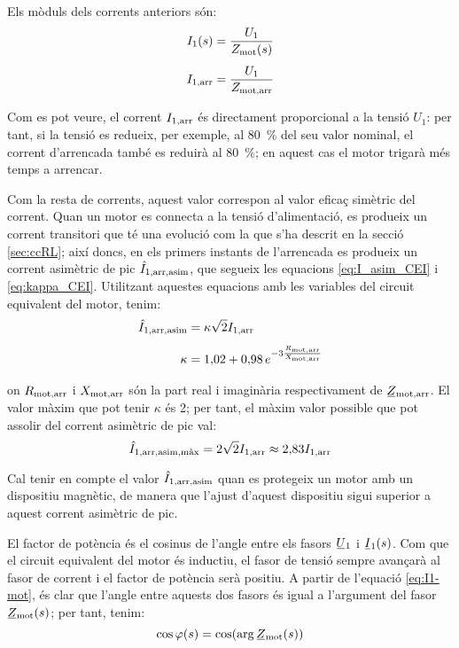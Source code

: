 Els mòduls dels corrents anteriors són:
\begin{subequations}
\begin{align}
    I_1(s) &= \frac{U_1}{Z_\mathrm{mot}(s)} \label{eq:mot-I1}\\[1ex]
    I_\mathrm{1,arr} &= \frac{U_1}{Z_\mathrm{mot,arr}}\label{eq:mot-Iarr}
\end{align}
\end{subequations}

Com es pot veure, el corrent $I_\mathrm{1,arr}$ és directament proporcional a la tensió $U_1$:  per tant, si la tensió es redueix, per exemple, al \qty{80}{\%} del seu valor nominal, el corrent d'arrencada també es reduirà al \qty{80}{\%}; en aquest cas el motor trigarà més temps a arrencar.

Com la resta de corrents, aquest valor correspon al valor eficaç simètric del corrent. Quan un motor es connecta a la tensió d'alimentació, es produeix un corrent transitori que té una evolució com la que s'ha descrit en la secció \vref{sec:ccRL}; així doncs, en els primers instants de l'arrencada es produeix un corrent asimètric de pic $\hat{I}_\mathrm{1,arr,asim}$, que segueix les equacions \eqref{eq:I_asim_CEI} i \eqref{eq:kappa_CEI}. Utilitzant aquestes equacions amb les variables del circuit equivalent del motor, tenim:
\begin{subequations}
\begin{align}
    \hat{I}_\mathrm{1,arr,asim} &= \kappa \sqrt{2} I_\mathrm{1,arr}  \\[1ex]
    \kappa &= 1{,}02 + 0{,}98 \,e^{-3\frac{R_\mathrm{mot,arr}}{X_\mathrm{mot,arr}}}
\end{align}
\end{subequations}

on $R_\mathrm{mot,arr}$ i $X_\mathrm{mot,arr}$ són la part real i imaginària respectivament de $\cmplx{Z}\ped{mot,arr}$. El valor màxim que pot tenir  $\kappa$ és 2;  per tant, el màxim valor possible que pot assolir del corrent asimètric de pic val:
\begin{equation}
	\hat{I}_\mathrm{1,arr,asim,\text{màx}} =  2\sqrt{2} I_\mathrm{1,arr} \approx 2{,}83 I_\mathrm{1,arr} 
\end{equation}

Cal tenir en compte el valor $\hat{I}_\mathrm{1,arr,asim}$ quan es protegeix un motor amb un dispositiu magnètic, de manera que l'ajust d'aquest dispositiu sigui superior a aquest corrent asimètric de  pic.

El factor de potència és el cosinus de l'angle entre els fasors $\cmplx{U}_1$ i $\cmplx{I}_1(s)$. Com que el circuit equivalent del motor és inductiu, el fasor de tensió sempre avançarà al fasor de corrent i el factor de potència serà positiu. A partir de l'equació \eqref{eq:I1-mot}, és clar que l'angle entre aquests dos fasors és igual a l'argument del fasor $\cmplx{Z}\ped{mot}(s)$; per tant, tenim:
\begin{equation}\index{motors d'inducció!factor de potència}
	\cos\varphi(s) = \cos(\arg\cmplx{Z}\ped{mot}(s))\label{eq:cos-fi-mot}
\end{equation}

